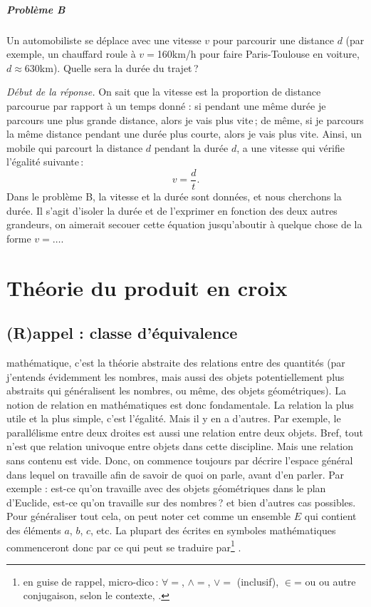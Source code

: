 	\paragraph{Problème B} Un automobiliste se déplace avec une vitesse $v$ pour parcourir une distance $d$ (par exemple, un chauffard roule à $v=$160km/h pour faire Paris-Toulouse en voiture, $d\approx 630$km). Quelle sera la durée du trajet\,?

	\emph{Début de la réponse.}
	On sait que la vitesse est la proportion de distance parcourue par rapport à un temps donné : si pendant une même durée je parcours une plus grande distance, alors je vais plus vite\,; de même, si je parcours la même distance pendant une durée plus courte, alors je vais plus vite. Ainsi, un mobile qui parcourt la distance $d$ pendant la durée $d$, a une vitesse qui vérifie l'égalité suivante\,:
	\begin{equation}
		v=\frac{d}{t}.
	\end{equation}
	Dans le problème B, la vitesse et la durée sont données, et nous cherchons la durée. Il s'agit d'isoler la durée et de l'exprimer en fonction des deux autres grandeurs, on aimerait secouer cette équation jusqu'aboutir à quelque chose de la forme \og{}$v=\ldots$\fg. 

\chapter{Théorie du produit en croix}\label{chap_croix}
	\section{(R)appel : classe d'équivalence}
		 mathématique, c'est la théorie abstraite des relations entre des quantités (par  j'entends évidemment les nombres, mais aussi des objets potentiellement plus abstraits qui généralisent les nombres, ou même, des objets géométriques). La notion de relation en mathématiques est donc fondamentale. La relation la plus utile et la plus simple, c'est l'égalité. Mais il y en a d'autres. Par exemple, le parallélisme entre deux droites est aussi une relation entre deux objets. Bref, tout n'est que relation univoque entre objets dans cette discipline. Mais une relation sans contenu est vide. Donc, on commence toujours par décrire l'espace général dans lequel on travaille afin de savoir de quoi on parle, avant d'en parler. Par exemple : est-ce qu'on travaille avec des objets géométriques dans le plan d'Euclide, est-ce qu'on travaille sur des nombres\,? et bien d'autres cas possibles. Pour généraliser tout cela, on peut noter cet  comme un ensemble $E$ qui contient des éléments $a$, $b$, $c$, etc. La plupart des  écrites en symboles mathématiques commenceront donc par  ce qui peut se traduire par\footnote{en guise de rappel, micro-dico\,: $\forall=$, $\wedge=$, $\lor=$ (inclusif), $\in$= ou  ou autre conjugaison, selon le contexte, .} .

